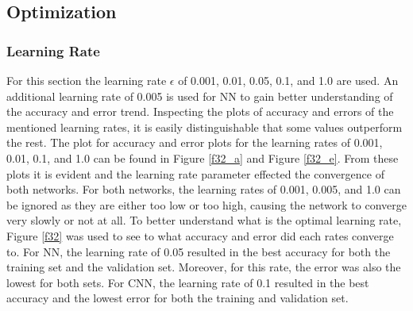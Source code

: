 \documentclass[12pt]{article}
\begin{document}
\subsection{Optimization}
\subsubsection*{Learning Rate}
For this section the learning rate $\epsilon$ of 0.001, 0.01, 0.05, 0.1, and 1.0 are used. An additional learning rate of 0.005 is used for NN to gain better understanding of the accuracy and error trend. Inspecting the plots of accuracy and errors of the mentioned learning rates, it is easily distinguishable that some values outperform the rest. The plot for accuracy and error plots for the learning rates of 0.001, 0.01, 0.1, and 1.0 can be found in Figure \ref{f32_a} and Figure \ref{f32_e}. From these plots it is evident and the learning rate parameter effected the convergence of both networks. For both networks, the learning rates of 0.001, 0.005, and 1.0 can be ignored as they are either too low or too high, causing the network to converge very slowly or not at all. To better understand what is the optimal learning rate, Figure \ref{f32} was used to see to what accuracy and error did each rates converge to. For NN, the learning rate of 0.05 resulted in the best accuracy for both the training set and the validation set. Moreover, for this rate, the error was also the lowest for both sets. For CNN, the learning rate of 0.1 resulted in the best accuracy and the lowest error for both the training and validation set.  
\end{document}
